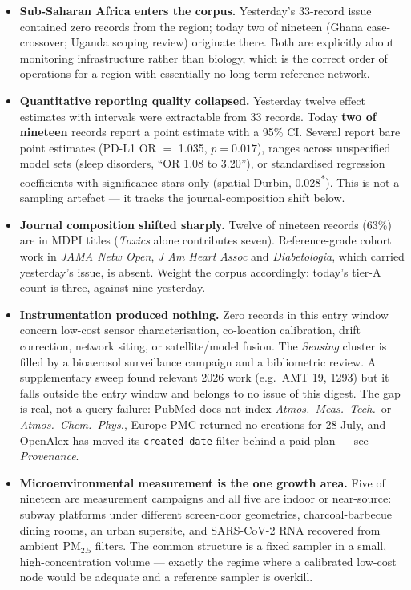 \documentclass[10pt]{article}
\begin{document}
\begin{itemize}
\item \textbf{Sub-Saharan Africa enters the corpus.} Yesterday's 33-record issue contained
zero records from the region; today two of nineteen (Ghana case-crossover; Uganda scoping
review) originate there. Both are explicitly about monitoring infrastructure rather than
biology, which is the correct order of operations for a region with essentially no
long-term reference network.

\item \textbf{Quantitative reporting quality collapsed.} Yesterday twelve effect estimates
with intervals were extractable from 33 records. Today \textbf{two of nineteen} records
report a point estimate with a 95\% CI. Several report bare point estimates
(PD-L1 OR $=$ 1.035, $p=0.017$), ranges across unspecified model sets
(sleep disorders, ``OR 1.08 to 3.20''), or standardised regression coefficients with
significance stars only (spatial Durbin, 0.028\textsuperscript{*}). This is not a
sampling artefact --- it tracks the journal-composition shift below.

\item \textbf{Journal composition shifted sharply.} Twelve of nineteen records (63\%) are
in MDPI titles (\textit{Toxics} alone contributes seven). Reference-grade cohort work in
\textit{JAMA Netw Open}, \textit{J Am Heart Assoc} and \textit{Diabetologia}, which
carried yesterday's issue, is absent. Weight the corpus accordingly: today's tier-A count
is three, against nine yesterday.

\item \textbf{Instrumentation produced nothing.} Zero records in this entry window concern
low-cost sensor characterisation, co-location calibration, drift correction, network
siting, or satellite/model fusion. The \textit{Sensing} cluster is filled by a bioaerosol
surveillance campaign and a bibliometric review. A supplementary sweep found relevant 2026
work (e.g.\ AMT 19, 1293) but it falls outside the entry window and belongs to no issue of
this digest. The gap is real, not a query failure: PubMed does not index
\textit{Atmos.\ Meas.\ Tech.}\ or \textit{Atmos.\ Chem.\ Phys.}, Europe PMC returned no
creations for 28 July, and OpenAlex has moved its \texttt{created\_date} filter behind a
paid plan --- see \emph{Provenance}.

\item \textbf{Microenvironmental measurement is the one growth area.} Five of nineteen are
measurement campaigns and all five are indoor or near-source: subway platforms under
different screen-door geometries, charcoal-barbecue dining rooms, an urban supersite, and
SARS-CoV-2 RNA recovered from ambient PM$_{2.5}$ filters. The common structure is a fixed
sampler in a small, high-concentration volume --- exactly the regime where a calibrated
low-cost node would be adequate and a reference sampler is overkill.
\end{itemize}
\end{document}
